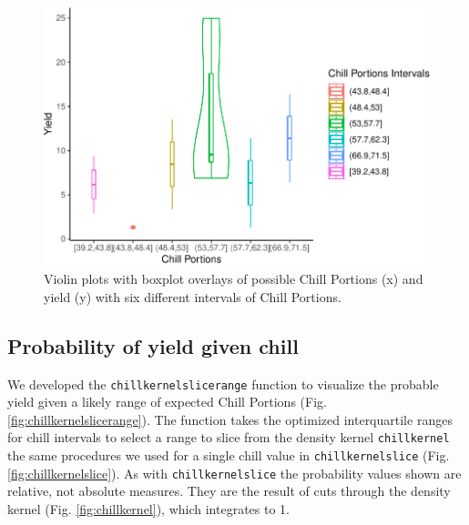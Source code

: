 \documentclass[]{article}
\begin{document}
\begin{figure}
\centering
\includegraphics{Full_SHE_Chill_Yield_Model_files/figure-latex/chillviolin-1.pdf}
\caption{\label{fig:chillviolin}Violin plots with boxplot overlays of
possible Chill Portions (x) and yield (y) with six different intervals
of Chill Portions.}
\end{figure}

\hypertarget{probability-of-yield-given-chill}{%
\subsection{Probability of yield given
chill}\label{probability-of-yield-given-chill}}

We developed the \texttt{chillkernelslicerange} function to visualize
the probable yield given a likely range of expected Chill Portions (Fig.
\ref{fig:chillkernelslicerange}). The function takes the optimized
interquartile ranges for chill intervals to select a range to slice from
the density kernel \texttt{chillkernel} the same procedures we used for
a single chill value in \texttt{chillkernelslice} (Fig.
\ref{fig:chillkernelslice}). As with \texttt{chillkernelslice} the
probability values shown are relative, not absolute measures. They are
the result of cuts through the density kernel (Fig.
\ref{fig:chillkernel}), which integrates to 1.
\end{document}
